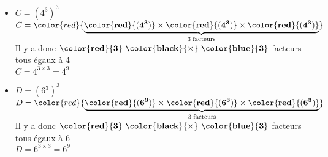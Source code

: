 \begin{corrige}
\begin{itemize}
        \bigskip
        \item $C=\left(4^3\right)^{3}$\\
        $C=\color{red}{\underbrace{\mathbf{\color{red}{(4^3)}} \times \mathbf{\color{red}{(4^3)}}\times \mathbf{\color{red}{(4^3)}}}_{3\thickspace\text{facteurs}}}$\\            
        Il y a donc $\mathbf{\color{red}{3}~\color{black}{\times}~\color{blue}{3}}$ facteurs tous égaux à $4$\\
        $C=4^{3\times3} = 4^{9}$

        \bigskip        
        \item $D=\left(6^3\right)^{3}$\\
        $D=\color{red}{\underbrace{\mathbf{\color{red}{(6^3)}} \times \mathbf{\color{red}{(6^3)}}\times \mathbf{\color{red}{(6^3)}}}_{3\thickspace\text{facteurs}}}$\\            
        Il y a donc $\mathbf{\color{red}{3}~\color{black}{\times}~\color{blue}{3}}$ facteurs tous égaux à $6$\\
        $D=6^{3\times3} = 6^{9}$        
    \end{itemize}
\end{corrige}